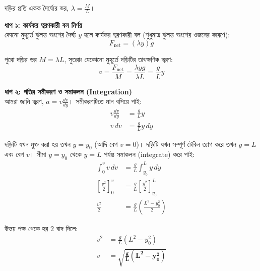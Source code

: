 \documentclass[12pt, a4paper]{article}
\begin{document}
\begin{tcolorbox}[solutionbox={সমাধান (Solution)}]
    \noindent
    দড়ির প্রতি একক দৈর্ঘ্যের ভর, $\lambda = \frac{M}{L}$।
    
    \vspace{0.5em}
    \noindent\textbf{ধাপ ১: কার্যকর ত্বরণকারী বল নির্ণয়} \\
    কোনো মুহূর্তে ঝুলন্ত অংশের দৈর্ঘ্য $y$ হলে কার্যকর ত্বরণকারী বল (শুধুমাত্র ঝুলন্ত অংশের ওজনের কারণে):
    \[ F_{\text{net}} = (\lambda y) g \]
    
    পুরো দড়ির ভর $M = \lambda L$, সুতরাং যেকোনো মুহূর্তে দড়িটির তাৎক্ষণিক ত্বরণ:
    \[ a = \frac{F_{\text{net}}}{M} = \frac{\lambda y g}{\lambda L} = \frac{g}{L} y \]
    
    \vspace{0.5em}
    \noindent\textbf{ধাপ ২: গতির সমীকরণ ও সমাকলন (Integration)} \\
    আমরা জানি ত্বরণ, $a = v \frac{dv}{dy}$। সমীকরণটিতে মান বসিয়ে পাই:
    \begin{align*}
        v \frac{dv}{dy} &= \frac{g}{L} y \\
        v \, dv &= \frac{g}{L} y \, dy
    \end{align*}
    
    দড়িটি যখন মুক্ত করা হয় তখন $y = y_0$ (আদি বেগ $v = 0$)। দড়িটি যখন সম্পূর্ণ টেবিল ত্যাগ করে তখন $y = L$ এবং বেগ $v$। সীমা $y = y_0$ থেকে $y = L$ পর্যন্ত সমাকলন (integrate) করে পাই:
    \begin{align*}
        \int_0^v v \, dv &= \frac{g}{L} \int_{y_0}^L y \, dy \\
        \left[ \frac{v^2}{2} \right]_0^v &= \frac{g}{L} \left[ \frac{y^2}{2} \right]_{y_0}^L \\
        \frac{v^2}{2} &= \frac{g}{L} \left( \frac{L^2 - y_0^2}{2} \right)
    \end{align*}
    
    উভয় পক্ষ থেকে হর $2$ বাদ দিলে:
    \begin{align*}
        v^2 &= \frac{g}{L} (L^2 - y_0^2) \\
        v &= \mathbf{\sqrt{\frac{g}{L} (L^2 - y_0^2)}}
    \end{align*}
\end{tcolorbox}
\end{document}
